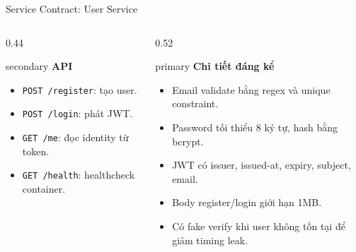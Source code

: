 \documentclass[aspectratio=169]{beamer}
\begin{document}
\begin{frame}{Service Contract: User Service}
    \begin{columns}[T,onlytextwidth]
        \begin{column}{0.44\textwidth}
            \begin{claimbox}{secondary}
                \textbf{API}
                \begin{itemize}\scriptsize
                    \item \texttt{POST /register}: tạo user.
                    \item \texttt{POST /login}: phát JWT.
                    \item \texttt{GET /me}: đọc identity từ token.
                    \item \texttt{GET /health}: healthcheck container.
                \end{itemize}
            \end{claimbox}
        \end{column}
        \begin{column}{0.52\textwidth}
            \begin{claimbox}{primary}
                \textbf{Chi tiết đáng kể}
                \begin{itemize}\small
                    \item Email validate bằng regex và unique constraint.
                    \item Password tối thiểu 8 ký tự, hash bằng bcrypt.
                    \item JWT có issuer, issued-at, expiry, subject, email.
                    \item Body register/login giới hạn 1MB.
                    \item Có fake verify khi user không tồn tại để giảm timing leak.
                \end{itemize}
            \end{claimbox}
        \end{column}
    \end{columns}
\end{frame}
\end{document}
